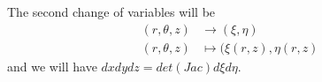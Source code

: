 The second change of variables will be 
\begin{align}\label{change3}
(r,\theta,z)&\to(\xi,\eta)\\
(r,\theta,z)&\mapsto(\xi(r,z),\eta(r,z)\nonumber
\end{align}
and we will have $ dxdydz=det(Jac)d\xi d\eta $.

